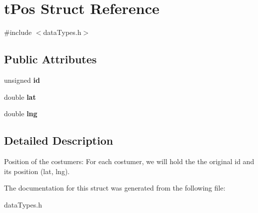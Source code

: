 \hypertarget{structt_pos}{
\section{tPos Struct Reference}
\label{structt_pos}
}


{\ttfamily \#include $<$dataTypes.h$>$}

\subsection*{Public Attributes}
\begin{DoxyCompactItemize}
\item 
\hypertarget{structt_pos_aad10b9636004fc95d4312b90a2ac3e49}{
unsigned {\bfseries id}}
\label{structt_pos_aad10b9636004fc95d4312b90a2ac3e49}

\item 
\hypertarget{structt_pos_afd926e8c6e2ee35f108e6ac2d0ce5b38}{
double {\bfseries lat}}
\label{structt_pos_afd926e8c6e2ee35f108e6ac2d0ce5b38}

\item 
\hypertarget{structt_pos_a0bed6cf2b902be44402710bbb271b652}{
double {\bfseries lng}}
\label{structt_pos_a0bed6cf2b902be44402710bbb271b652}

\end{DoxyCompactItemize}


\subsection{Detailed Description}
Position of the costumers: For each costumer, we will hold the the original id and its position (lat, lng). 

The documentation for this struct was generated from the following file:\begin{DoxyCompactItemize}
\item 
dataTypes.h\end{DoxyCompactItemize}
